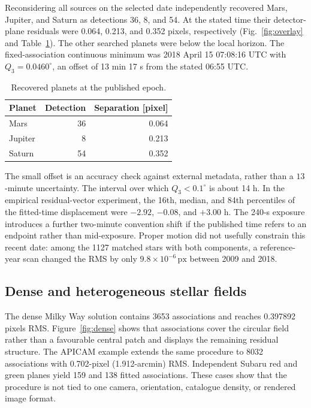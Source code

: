 \documentclass{aa}
\newcommand{\px}{\,\mathrm{px}}
\begin{document}
Reconsidering all sources on the selected date independently recovered Mars,
Jupiter, and Saturn as detections 36, 8, and 54. At the stated time their
detector-plane residuals were 0.064, 0.213, and 0.352 pixels, respectively
(Fig.~\ref{fig:overlay} and Table~\ref{tab:planets}). The other searched planets
were below the local horizon. The fixed-association continuous minimum was
2018 April 15 07:08:16 UTC with $Q_3=0.0460^\circ$, an offset of 13 min 17 s
from the stated 06:55 UTC.

\begin{table}
  \caption{Recovered planets at the published epoch.}
  \label{tab:planets}
  \centering
  \begin{tabular}{lrr}
    \hline\hline
    Planet & Detection & Separation [pixel] \\
    \hline
    Mars    & 36 & 0.064 \\
    Jupiter &  8 & 0.213 \\
    Saturn  & 54 & 0.352 \\
    \hline
  \end{tabular}
\end{table}

The small offset is an accuracy check against external metadata, rather than a
$13$-minute uncertainty. The interval over which $Q_3<0.1^\circ$ is about
14 h. In the empirical residual-vector experiment, the 16th, median, and 84th
percentiles of the fitted-time displacement were $-2.92$, $-0.08$, and
$+3.00$ h. The 240-s exposure introduces a further two-minute convention shift
if the published time refers to an endpoint rather than mid-exposure. Proper
motion did not usefully constrain this recent date: among the 1127 matched stars
with both components, a reference-year scan changed the RMS by only
$9.8\times10^{-6}\px$ between 2009 and 2018.

\subsection{Dense and heterogeneous stellar fields}

The dense Milky Way solution contains 3653 associations and reaches
0.397892 pixels RMS. Figure~\ref{fig:dense} shows that associations cover the
circular field rather than a favourable central patch and displays the
remaining residual structure. The APICAM example extends the same procedure
to 8032 associations with 0.702-pixel (1.912-arcmin) RMS. Independent Subaru
red and green planes yield 159 and 138 fitted associations. These cases show
that the procedure is not tied to one camera, orientation, catalogue density,
or rendered image format.
\end{document}
